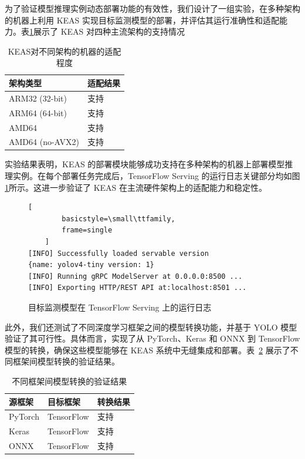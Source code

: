 为了验证模型推理实例动态部署功能的有效性，我们设计了一组实验，在多种架构的机器上利用 KEAS 实现目标监测模型的部署，并评估其运行准确性和适配能力。表\ref{tab:multi-arch-zhichi}展示了 KEAS 对四种主流架构的支持情况

\begin{table}[ht]
    \renewcommand{\arraystretch}{1.5}
    \centering
    \caption{KEAS对不同架构的机器的适配程度}
    \label{tab:multi-arch-zhichi}
    \begin{tabular}{|l|l|}
        \hline
        \textbf{架构类型} & \textbf{适配结果}  \\ \hline
        ARM32 (32-bit) & 支持 \\ \hline
        ARM64 (64-bit) & 支持 \\ \hline
        AMD64 & 支持 \\ \hline
        AMD64 (no-AVX2) & 支持 \\ \hline
    \end{tabular}
\end{table}

实验结果表明，KEAS 的部署模块能够成功支持在多种架构的机器上部署模型推理实例。在每个部署任务完成后，TensorFlow Serving 的运行日志关键部分均如图\ref{fig:aiapply}所示。这进一步验证了 KEAS 在主流硬件架构上的适配能力和稳定性。

\begin{figure}[ht]
    \centering
    \begin{lstlisting}[
        basicstyle=\small\ttfamily, 
        frame=single
    ]
[INFO] Successfully loaded servable version 
{name: yolov4-tiny version: 1}
[INFO] Running gRPC ModelServer at 0.0.0.0:8500 ...
[INFO] Exporting HTTP/REST API at:localhost:8501 ...
\end{lstlisting}
    \caption{目标监测模型在 TensorFlow Serving 上的运行日志}
    \label{fig:aiapply}
\end{figure}

此外，我们还测试了不同深度学习框架之间的模型转换功能，并基于 YOLO 模型验证了其可行性。具体而言，实现了从 PyTorch、Keras 和 ONNX 到 TensorFlow 模型的转换，确保这些模型能够在 KEAS 系统中无缝集成和部署。表~\ref{tab:model-conversion-results} 展示了不同框架间模型转换的验证结果。

\begin{table}[ht]
    \renewcommand{\arraystretch}{1.5}
    \centering
    \caption{不同框架间模型转换的验证结果}
    \label{tab:model-conversion-results}
    \begin{tabular}{|l|l|l|}
        \hline
        \textbf{源框架} & \textbf{目标框架} & \textbf{转换结果} \\ \hline
        PyTorch & TensorFlow & 支持 \\ \hline
        Keras & TensorFlow & 支持 \\ \hline
        ONNX & TensorFlow & 支持 \\ \hline
    \end{tabular}
\end{table}


